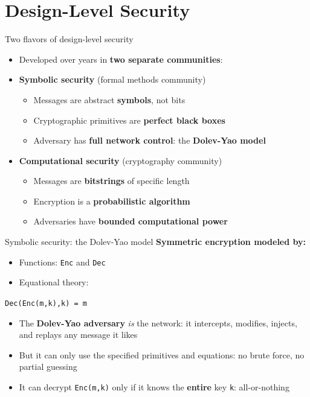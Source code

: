 \ifdefined\PRESENTATION\else\PassOptionsToClass{handout}{beamer}\fi\documentclass[aspectratio=169, lualatex]{beamer}
\begin{document}
\section{Design-Level Security}

\begin{frame}{Two flavors of design-level security}
	\begin{itemize}
		\item Developed over years in \textbf{two separate communities}:
		      \vspace{0.5em}
		\item \textbf{Symbolic security} (formal methods community)
		      \begin{itemize}
			      \item Messages are abstract \textbf{symbols}, not bits
			      \item Cryptographic primitives are \textbf{perfect black boxes}
			      \item Adversary has \textbf{full network control}: the \textbf{Dolev-Yao model}
		      \end{itemize}
		      \vspace{0.5em}
		\item \textbf{Computational security} (cryptography community)
		      \begin{itemize}
			      \item Messages are \textbf{bitstrings} of specific length
			      \item Encryption is a \textbf{probabilistic algorithm}
			      \item Adversaries have \textbf{bounded computational power}
		      \end{itemize}
	\end{itemize}
\end{frame}

\begin{frame}{Symbolic security: the Dolev-Yao model}
	\textbf{Symmetric encryption modeled by:}
	\begin{itemize}
		\item Functions: \texttt{Enc} and \texttt{Dec}
		\item Equational theory:
	\end{itemize}
	\begin{center}
		\Large
		\texttt{Dec(Enc(m,k),k) = m}
	\end{center}
	\begin{itemize}
		\item The \textbf{Dolev-Yao adversary} \textit{is} the network: it intercepts, modifies, injects, and replays any message it likes
		\item But it can only use the specified primitives and equations: no brute force, no partial guessing
		\item It can decrypt \texttt{Enc(m,k)} only if it knows the \textbf{entire} key \texttt{k}: all-or-nothing
	\end{itemize}
\end{frame}
\end{document}
